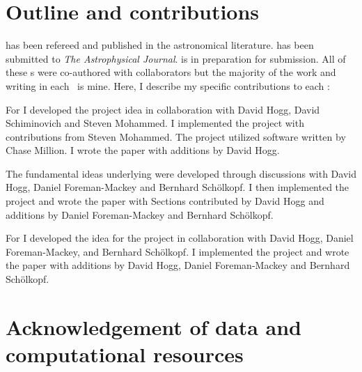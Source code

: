 \section{Outline and contributions}
 has been refereed and published in the astronomical literature.
 has been submitted to \emph{The Astrophysical Journal}.
 is in preparation for submission.
All of these \chapname s were co-authored with collaborators but the majority of the work and writing in each \chapname\ is mine.
Here, I describe my specific contributions to each \chapname:
\begin{enumerate}

{\item For   I developed the project idea in collaboration with David Hogg, David Schiminovich and Steven Mohammed.
I implemented the project with contributions from Steven Mohammed.
The project utilized software written by Chase Million.
I wrote the paper with additions by David Hogg.}

{\item The fundamental ideas underlying  were developed through discussions with David Hogg, Daniel Foreman-Mackey and Bernhard Sch\"olkopf.
I then implemented the project and wrote the paper with Sections contributed by David Hogg and additions by Daniel Foreman-Mackey and Bernhard Sch\"olkopf.}

{\item For  I developed the idea for the project in collaboration with David Hogg, Daniel Foreman-Mackey, and Bernhard Sch\"olkopf.
I implemented the project and wrote the paper with additions by David Hogg, Daniel Foreman-Mackey and Bernhard Sch\"olkopf.
}
\end{enumerate}

\section{Acknowledgement of data and computational resources}

